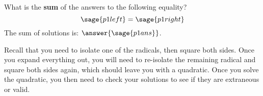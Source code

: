 \documentclass{ximera}
\begin{document}
\begin{problem}
    What is the \textbf{sum} of the answers to the following equality?
    \[
        \sage{p1left} = \sage{p1right}
    \]
    The sum of solutions is: $\answer{\sage{p1ans}}$.
    \begin{feedback}
        Recall that you need to isolate one of the radicals, then square both sides. Once you expand everything out, you will need to re-isolate the remaining radical and square both sides again, which should leave you with a quadratic. Once you solve the quadratic, you then need to check your solutions to see if they are extraneous or valid. 
    \end{feedback}
\end{problem}
\end{document}
